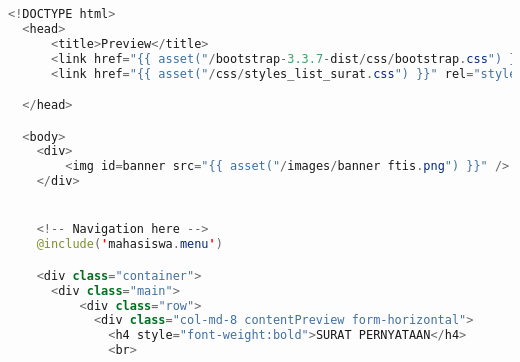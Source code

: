 \begin{lstlisting}[language=Java,basicstyle=\tiny,caption=Preview isi data keterangan beasiswa]
	<!DOCTYPE html>
  <head>
      <title>Preview</title>
      <link href="{{ asset("/bootstrap-3.3.7-dist/css/bootstrap.css") }}" rel="stylesheet" type="text/css" />
      <link href="{{ asset("/css/styles_list_surat.css") }}" rel="stylesheet" type="text/css">

  </head>

  <body>
    <div>
        <img id=banner src="{{ asset("/images/banner ftis.png") }}" />
    </div>


    <!-- Navigation here -->
    @include('mahasiswa.menu')

    <div class="container">
      <div class="main">
          <div class="row">
            <div class="col-md-8 contentPreview form-horizontal">
              <h4 style="font-weight:bold">SURAT PERNYATAAN</h4>
              <br>


\end{lstlisting}

